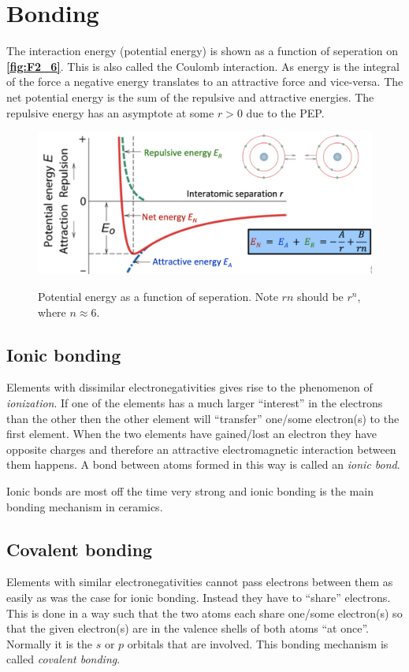 \section{Bonding}
The interaction energy (potential energy) is shown as a function of seperation on \textbf{\autoref{fig:F2_6}}. This is also called the Coulomb interaction. As energy is the integral of the force a negative energy translates to an attractive force and vice-versa. The net potential energy is the sum of the repulsive and attractive energies. The repulsive energy has an asymptote at some $r > 0$ due to the PEP.
\begin{figure} [ht]
  \centering
  \caption{Potential energy as a function of seperation. Note $rn$ should be $r^n$, where $n \approx 6$.}
  \includegraphics[width=0.75\linewidth]{./figures/F2_6.png}
  \label{fig:F2_6}
\end{figure}

\subsection{Ionic bonding}
Elements with dissimilar electronegativities gives rise to the phenomenon of \textit{ionization}. If one of the elements has a much larger ``interest'' in the electrons than the other then the other element will ``transfer'' one/some electron(s) to the first element. When the two elements have gained/lost an electron they have opposite charges and therefore an attractive electromagnetic interaction between them happens. A bond between atoms formed in this way is called an \textit{ionic bond}.

Ionic bonds are most off the time very strong and ionic bonding is the main bonding mechanism in ceramics.


\subsection{Covalent bonding}
Elements with similar electronegativities cannot pass electrons between them as easily as was the case for ionic bonding. Instead they have to ``share'' electrons. This is done in a way such that the two atoms each share one/some electron(s) so that the given electron(s) are in the valence shells of both atoms ``at once''. Normally it is the $s$ or $p$ orbitals that are involved. This bonding mechanism is called \textit{covalent bonding}.

